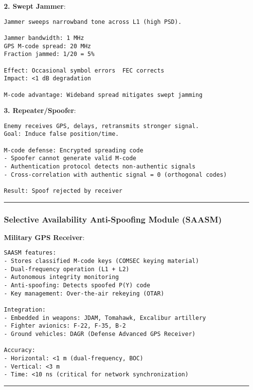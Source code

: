 \textbf{2. Swept Jammer}:

\begin{verbatim}
Jammer sweeps narrowband tone across L1 (high PSD).

Jammer bandwidth: 1 MHz
GPS M-code spread: 20 MHz
Fraction jammed: 1/20 = 5%

Effect: Occasional symbol errors  FEC corrects
Impact: <1 dB degradation

M-code advantage: Wideband spread mitigates swept jamming
\end{verbatim}

\textbf{3. Repeater/Spoofer}:

\begin{verbatim}
Enemy receives GPS, delays, retransmits stronger signal.
Goal: Induce false position/time.

M-code defense: Encrypted spreading code
- Spoofer cannot generate valid M-code
- Authentication protocol detects non-authentic signals
- Cross-correlation with authentic signal = 0 (orthogonal codes)

Result: Spoof rejected by receiver
\end{verbatim}

\begin{center}\rule{0.5\linewidth}{0.5pt}\end{center}

\subsubsection{Selective Availability Anti-Spoofing Module
(SAASM)}\label{selective-availability-anti-spoofing-module-saasm}

\textbf{Military GPS Receiver}:

\begin{verbatim}
SAASM features:
- Stores classified M-code keys (COMSEC keying material)
- Dual-frequency operation (L1 + L2)
- Autonomous integrity monitoring
- Anti-spoofing: Detects spoofed P(Y) code
- Key management: Over-the-air rekeying (OTAR)

Integration:
- Embedded in weapons: JDAM, Tomahawk, Excalibur artillery
- Fighter avionics: F-22, F-35, B-2
- Ground vehicles: DAGR (Defense Advanced GPS Receiver)

Accuracy:
- Horizontal: <1 m (dual-frequency, BOC)
- Vertical: <3 m
- Time: <10 ns (critical for network synchronization)
\end{verbatim}

\begin{center}\rule{0.5\linewidth}{0.5pt}\end{center}

